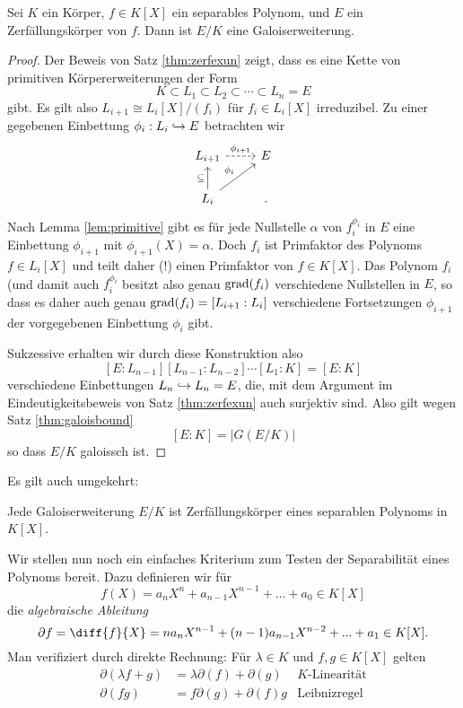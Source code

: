 \documentclass{book}
\begin{document}
\begin{thm}
    \label{thm:sepgalois}
    Sei $K$ ein Körper, $f \in K[X]$ ein separables Polynom, und $E$ ein
    Zerfällungskörper von $f$. Dann ist $E/K$ eine Galoiserweiterung. 
\end{thm}
\begin{proof}
    Der Beweis von Satz \ref{thm:zerfexun} zeigt, dass es eine Kette von
    primitiven Körpererweiterungen der Form 
    \[
        K \subset L_1 \subset L_2 \subset \cdots \subset L_n = E
    \]
    gibt. Es gilt also $L_{i+1} \cong L_i[X]/(f_i)$ für $f_i \in L_i[X]$
    irreduzibel. Zu einer gegebenen Einbettung $\phi_i: L_i \hra E$ betrachten
    wir
    \[
    \begin{tikzcd}
        L_{i+1}\ar[dashed]{r}{\phi_{i+1}} & E \\
        L_i \ar{ur}{\phi_i} \ar{u}{\subset}& .
    \end{tikzcd}
    \]
    Nach Lemma \ref{lem:primitive} gibt es für jede Nullstelle $\alpha$ von
    $f_i^{\phi_i}$ in $E$ eine Einbettung $\phi_{i+1}$ mit $\phi_{i+1}(X) =
    \alpha$. Doch $f_i$ ist Primfaktor des Polynoms $f \in L_i[X]$ und teilt
    daher (!) einen Primfaktor von $f \in K[X]$. Das Polynom $f_i$ (und damit
    auch $f_i^{\phi_i}$ besitzt also genau $\operatorname{grad}(f_i)$ verschiedene Nullstellen
    in $E$, so dass es daher auch genau $\operatorname{grad}(f_i) = [L_{i+1}:L_i]$
    verschiedene Fortsetzungen $\phi_{i+1}$ der vorgegebenen Einbettung
    $\phi_i$ gibt. 

    Sukzessive erhalten wir durch diese Konstruktion also 
    \[
        [E:L_{n-1}] [L_{n-1}:L_{n-2}] \cdots [L_1:K] = [E:K]
    \]
    verschiedene Einbettungen $L_n \hookrightarrow L_n = E$, die, mit dem Argument im
    Eindeutigkeitsbeweis von Satz \ref{thm:zerfexun} auch surjektiv sind. Also gilt
    wegen Satz \ref{thm:galoisbound}
    \[
           [E:K] = |G(E/K)| 
    \]
    so dass $E/K$ galoissch ist. 
\end{proof}

Es gilt auch umgekehrt:

\begin{prob}
    \label{prob:galois}
    Jede Galoiserweiterung $E/K$ ist Zerfällungskörper eines separablen Polynoms in $K[X]$. 
\end{prob}

Wir stellen nun noch ein einfaches Kriterium zum Testen der Separabilität eines Polynoms bereit. Dazu definieren wir für 
\[
    f(X) = a_n X^n + a_{n-1} X^{n-1} + ... + a_0 \in K[X]
\]
die \emph{algebraische Ableitung}
\[
    \partial f = \diff{f}{X} = n a_n X^{n-1} + (n-1) a_{n-1} X^{n-2} + ... + a_1 \in K[X].
\]
Man verifiziert durch direkte Rechnung: Für $\lambda \in K$ und $f,g \in K[X]$ gelten
\begin{align}
    \partial(\lambda f + g) & = \lambda \partial(f) + \partial(g) & \text{$K$-Linearität}\\
    \partial(fg) &= f \partial(g) + \partial(f)g & \text{Leibnizregel} \label{eq:leibniz}
\end{align}
\end{document}
